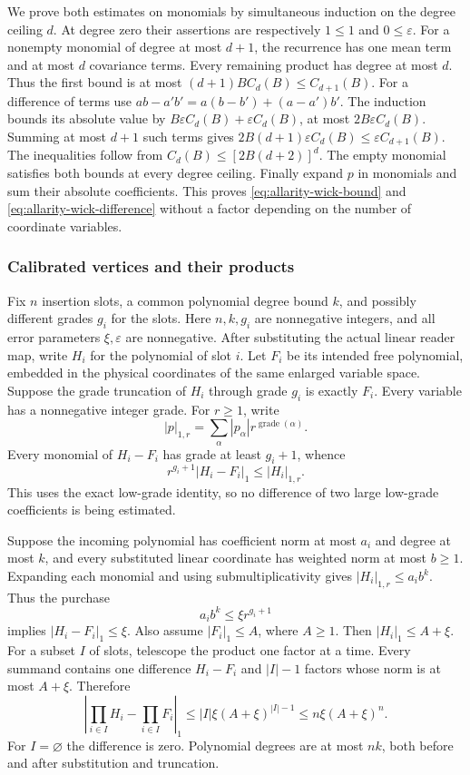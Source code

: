 We prove both estimates on monomials by simultaneous induction on the
degree ceiling $d$. At degree zero their assertions are respectively
$1\le1$ and $0\le\varepsilon$. For a nonempty monomial of degree at
most $d+1$, the recurrence has one mean term and at most $d$ covariance
terms. Every remaining product has degree at most $d$. Thus the first
bound is at most $(d+1)B C_d(B)\le C_{d+1}(B)$.
For a difference of terms use
$ab-a'b'=a(b-b')+(a-a')b'$. The induction bounds its absolute value
by $B\varepsilon C_d(B)+\varepsilon C_d(B)$, at most
$2B\varepsilon C_d(B)$. Summing at most $d+1$ such terms gives
$2B(d+1)\varepsilon C_d(B)\le\varepsilon C_{d+1}(B)$.
The inequalities follow from
$C_d(B)\le[2B(d+2)]^d$. The empty monomial satisfies both bounds
at every degree ceiling. Finally expand $p$ in monomials and sum their
absolute coefficients. This proves \eqref{eq:allarity-wick-bound}
and \eqref{eq:allarity-wick-difference} without a factor depending on
the number of coordinate variables.

\subsubsection{Calibrated vertices and their products}

Fix $n$ insertion slots, a common polynomial degree bound $k$, and
possibly different grades $g_i$ for the slots. Here $n,k,g_i$ are
nonnegative integers, and all error parameters $\xi,\varepsilon$ are
nonnegative. After substituting the
actual linear reader map, write $H_i$ for the polynomial of slot $i$.
Let $F_i$ be its intended free polynomial, embedded in the physical
coordinates of the same enlarged variable space. Suppose the grade
truncation of $H_i$ through grade $g_i$ is exactly $F_i$.
Every variable has a nonnegative integer grade. For $r\ge1$, write
\[
 |p|_{1,r}=\sum_\alpha |p_\alpha|r^{\operatorname{grade}(\alpha)}.
\]
Every monomial of $H_i-F_i$ has grade at least $g_i+1$, whence
\begin{equation}\label{eq:allarity-grade-tail}
 r^{g_i+1}|H_i-F_i|_1\le |H_i|_{1,r}.
\end{equation}
This uses the exact low-grade identity, so no difference of two large
low-grade coefficients is being estimated.

Suppose the incoming polynomial has coefficient norm at most $a_i$
and degree at most $k$, and every substituted linear coordinate has
weighted norm at most $b\ge1$. Expanding each monomial and using
submultiplicativity gives $|H_i|_{1,r}\le a_i b^k$. Thus the purchase
\[
                    a_i b^k\le\xi r^{g_i+1}
\]
implies $|H_i-F_i|_1\le\xi$. Also assume $|F_i|_1\le A$, where
$A\ge1$. Then $|H_i|_1\le A+\xi$.
For a subset $I$ of slots, telescope the product one factor at a time.
Every summand contains one difference $H_i-F_i$ and $|I|-1$ factors
whose norm is at most $A+\xi$. Therefore
\begin{equation}\label{eq:allarity-vertex-product}
 \left|\prod_{i\in I}H_i-\prod_{i\in I}F_i\right|_1
 \le |I|\xi(A+\xi)^{|I|-1}
 \le n\xi(A+\xi)^n.
\end{equation}
For $I=\varnothing$ the difference is zero. Polynomial degrees are at
most $nk$, both before and after substitution and truncation.


